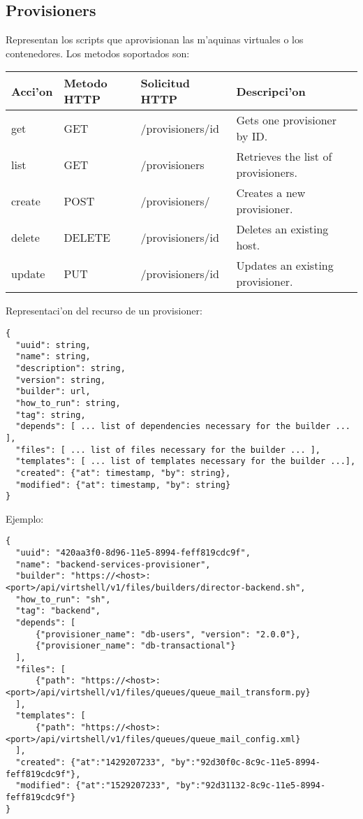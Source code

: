 \subsection{Provisioners}
Representan los scripts que aprovisionan las m'aquinas virtuales o los contenedores. Los metodos soportados son:

\begin{center}
 \begin{tabular}{| l | l | l | l |}
 \hline
  \rowcolor{blueapi}
  \textbf{Acci'on} & \textbf{Metodo HTTP} & \textbf{Solicitud HTTP} & \textbf{Descripci'on} \\ [0.5ex] 
  \hline\hline
  get & GET & /provisioners/id & Gets one provisioner by ID. \\
  \hline
  list & GET & /provisioners & Retrieves the list of provisioners. \\
  \hline  
  create & POST & /provisioners/ & Creates a new provisioner. \\
  \hline
  delete & DELETE & /provisioners/id & Deletes an existing host. \\
  \hline  
  update & PUT & /provisioners/id & Updates an existing provisioner. \\ [1ex] 
  \hline
\end{tabular}
\end{center}

Representaci'on del recurso de un provisioner:

\medskip
\begin{lstlisting}[style=json]
{
  "uuid": string,
  "name": string,
  "description": string,
  "version": string,
  "builder": url,
  "how_to_run": string,
  "tag": string,
  "depends": [ ... list of dependencies necessary for the builder ... ],
  "files": [ ... list of files necessary for the builder ... ],
  "templates": [ ... list of templates necessary for the builder ...],
  "created": {"at": timestamp, "by": string},
  "modified": {"at": timestamp, "by": string}
}

\end{lstlisting}

Ejemplo:

\medskip
\begin{lstlisting}[style=json]
{
  "uuid": "420aa3f0-8d96-11e5-8994-feff819cdc9f",
  "name": "backend-services-provisioner",
  "builder": "https://<host>:<port>/api/virtshell/v1/files/builders/director-backend.sh",
  "how_to_run": "sh",
  "tag": "backend",
  "depends": [
      {"provisioner_name": "db-users", "version": "2.0.0"},
      {"provisioner_name": "db-transactional"}
  ],
  "files": [
      {"path": "https://<host>:<port>/api/virtshell/v1/files/queues/queue_mail_transform.py}
  ],
  "templates": [
      {"path": "https://<host>:<port>/api/virtshell/v1/files/queues/queue_mail_config.xml}
  ],        
  "created": {"at":"1429207233", "by":"92d30f0c-8c9c-11e5-8994-feff819cdc9f"},
  "modified": {"at":"1529207233", "by":"92d31132-8c9c-11e5-8994-feff819cdc9f"}
}
\end{lstlisting}


